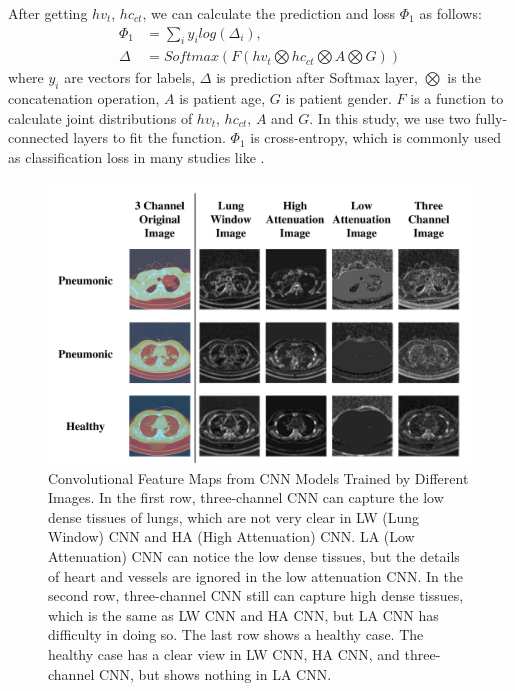 \documentclass[journal]{IEEEtran}
\begin{document}
After getting $hv_t$, $hc_{ct}$, we can calculate the prediction and loss $\Phi_1$ as follows:
\begin{align*}\label{classifyandloss1}
    \Phi_1 &= \sum_i{y_i log(\Delta_i)}, \\
    \Delta &= Softmax(F(hv_t \bigotimes hc_{ct} \bigotimes A \bigotimes G))
\end{align*}
where $y_i$ are vectors for labels, $\Delta$ is prediction after Softmax layer, $\bigotimes$ is the concatenation operation, $A$ is patient age, $G$ is patient gender. $F$ is a function to calculate joint distributions of $hv_t$, $hc_{ct}$, $A$ and $G$. In this study, we use two fully-connected layers to fit the function. $\Phi_1$ is cross-entropy, which is commonly used as classification loss in many studies like \cite{Zreik2018A}.
\begin{figure}[htbp]
    \centerline{\includegraphics[width=150mm]{show.pdf}}
    \vspace{-0cm}
    \caption{Convolutional Feature Maps from CNN Models Trained by Different Images. In the first row, three-channel CNN can capture the low dense tissues of lungs, which are not very clear in LW (Lung Window) CNN and HA (High Attenuation) CNN. LA (Low Attenuation) CNN can notice the low dense tissues, but the details of heart and vessels are ignored in the low attenuation CNN. 
    In the second row, three-channel CNN still can capture high dense tissues, which is the same as LW CNN and HA CNN, but LA CNN has difficulty in doing so. The last row shows a healthy case. The healthy case has a clear view in LW CNN, HA CNN, and three-channel CNN, but shows nothing in LA CNN.}
    \vspace{-0cm}
    \label{show}
    \end{figure}
\end{document}
